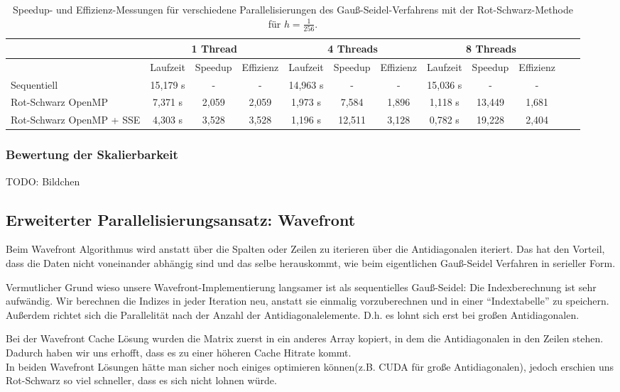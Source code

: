 \documentclass{article}
\begin{document}
\begin{table}[h!]
\centering
\small
\begin{tabular}{p{1.5cm}|c|c|c|c|c|c|c|c|c|c|c}
 & \multicolumn{3}{c|}{1 Thread} & \multicolumn{3}{c|}{4 Threads} & \multicolumn{3}{c}{8 Threads}  \\ 
\hline 
 & Laufzeit & Speedup & Effizienz & Laufzeit & Speedup & Effizienz & Laufzeit & Speedup & Effizienz \\ 
\hline 
Sequentiell & 15,179 s & - & - &  14,963 s & - & - & 15,036 s & - & - \\
\hline
Rot-Schwarz OpenMP & 7,371 s & 2,059 & 2,059 & 1,973 s & 7,584 & 1,896 & 1,118 s & 13,449 & 1,681 \\ 
\hline
Rot-Schwarz OpenMP + SSE & 4,303 s & 3,528 & 3,528 & 1,196 s & 12,511 & 3,128 & 0,782 s & 19,228 & 2,404 \\ 
\hline 
\end{tabular}
\caption{Speedup- und Effizienz-Messungen für verschiedene Parallelisierungen des Gauß-Seidel-Verfahrens mit der Rot-Schwarz-Methode für $h=\frac{1}{256}$.}
\end{table}

\subsubsection*{Bewertung der Skalierbarkeit}
TODO: Bildchen

\subsection{Erweiterter Parallelisierungsansatz: Wavefront}
Beim Wavefront Algorithmus wird anstatt über die Spalten oder Zeilen zu iterieren über die Antidiagonalen iteriert. Das hat den Vorteil, dass die Daten nicht voneinander abhängig sind und das selbe herauskommt, wie beim eigentlichen Gauß-Seidel Verfahren in serieller Form.

Vermutlicher Grund wieso unsere Wavefront-Implementierung langsamer ist als sequentielles Gauß-Seidel: Die Indexberechnung ist sehr aufwändig. Wir berechnen  die Indizes in jeder Iteration neu, anstatt sie einmalig vorzuberechnen und in einer ``Indextabelle'' zu speichern. Außerdem richtet sich die Parallelität nach der Anzahl der Antidiagonalelemente. D.h. es lohnt sich erst bei großen Antidiagonalen.

Bei der Wavefront Cache Lösung wurden die Matrix zuerst in ein anderes Array kopiert, in dem die Antidiagonalen in den Zeilen stehen. Dadurch haben wir uns erhofft, dass es zu einer höheren Cache Hitrate kommt. \\
In beiden Wavefront Lösungen hätte man sicher noch einiges optimieren können(z.B. CUDA für große Antidiagonalen), jedoch erschien uns Rot-Schwarz so viel schneller, dass es sich nicht lohnen würde.
\end{document}
